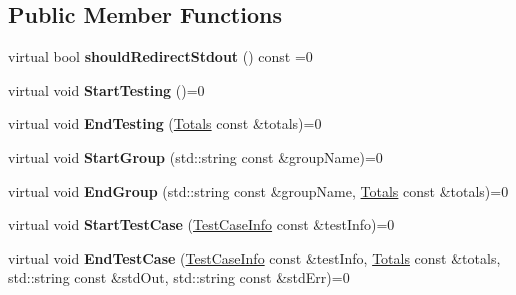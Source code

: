 \subsection*{Public Member Functions}
\begin{DoxyCompactItemize}
\item 
\hypertarget{struct_catch_1_1_i_reporter_aebd8c20478de29bba9b5a9f3845c18dc}{virtual bool {\bfseries should\-Redirect\-Stdout} () const =0}\label{struct_catch_1_1_i_reporter_aebd8c20478de29bba9b5a9f3845c18dc}

\item 
\hypertarget{struct_catch_1_1_i_reporter_afcf38d6ff912a9b2c7f07da45fcd5cb1}{virtual void {\bfseries Start\-Testing} ()=0}\label{struct_catch_1_1_i_reporter_afcf38d6ff912a9b2c7f07da45fcd5cb1}

\item 
\hypertarget{struct_catch_1_1_i_reporter_a8f1ae9b07d7feb22f6b1ca61924a6cbf}{virtual void {\bfseries End\-Testing} (\hyperlink{struct_catch_1_1_totals}{Totals} const \&totals)=0}\label{struct_catch_1_1_i_reporter_a8f1ae9b07d7feb22f6b1ca61924a6cbf}

\item 
\hypertarget{struct_catch_1_1_i_reporter_a8bbe6459db57886e80ee312aa38af8e0}{virtual void {\bfseries Start\-Group} (std\-::string const \&group\-Name)=0}\label{struct_catch_1_1_i_reporter_a8bbe6459db57886e80ee312aa38af8e0}

\item 
\hypertarget{struct_catch_1_1_i_reporter_a8b19ae2efce9057bf47e10720c5a4c16}{virtual void {\bfseries End\-Group} (std\-::string const \&group\-Name, \hyperlink{struct_catch_1_1_totals}{Totals} const \&totals)=0}\label{struct_catch_1_1_i_reporter_a8b19ae2efce9057bf47e10720c5a4c16}

\item 
\hypertarget{struct_catch_1_1_i_reporter_aeedd3dd4036feec8bd8866383fddacaa}{virtual void {\bfseries Start\-Test\-Case} (\hyperlink{struct_catch_1_1_test_case_info}{Test\-Case\-Info} const \&test\-Info)=0}\label{struct_catch_1_1_i_reporter_aeedd3dd4036feec8bd8866383fddacaa}

\item 
\hypertarget{struct_catch_1_1_i_reporter_a3da1e768e205533165e2fda4af7e0f4f}{virtual void {\bfseries End\-Test\-Case} (\hyperlink{struct_catch_1_1_test_case_info}{Test\-Case\-Info} const \&test\-Info, \hyperlink{struct_catch_1_1_totals}{Totals} const \&totals, std\-::string const \&std\-Out, std\-::string const \&std\-Err)=0}\label{struct_catch_1_1_i_reporter_a3da1e768e205533165e2fda4af7e0f4f}


\end{DoxyCompactItemize}
